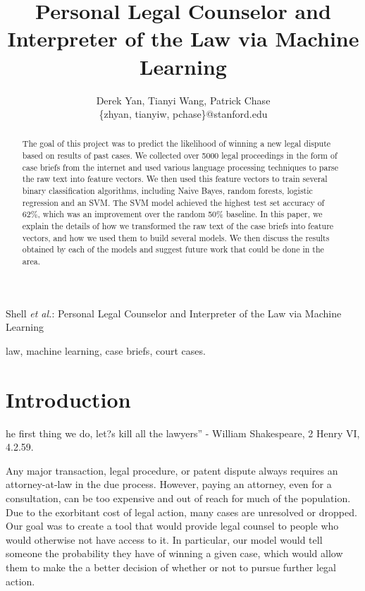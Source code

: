 \documentclass[journal]{IEEEtran}
\begin{document}
\title{Personal Legal Counselor and Interpreter of the Law via Machine Learning}
\author{Derek Yan, Tianyi Wang, Patrick Chase\\
\{zhyan, tianyiw, pchase\}@stanford.edu}
{Shell \MakeLowercase{\textit{et al.}}: Personal Legal Counselor and Interpreter of the Law via Machine Learning}
\maketitle

\begin{abstract}
The goal of this project was to predict the likelihood of winning a new legal dispute based on results of past cases. We collected over 5000 legal proceedings in the form of case briefs from the internet and used various language processing techniques to parse the raw text into feature vectors. We then used this feature vectors to train several binary classification algorithms, including Naive Bayes, random forests, logistic regression and an SVM. The SVM model achieved the highest test set accuracy of 62\%, which was an improvement over the random 50\% baseline. In this paper, we explain the details of how we transformed the raw text of the case briefs into feature vectors, and how we used them to build several models. We then discuss the results obtained by each of the models and suggest future work that could be done in the area.
\end{abstract}

\begin{keywords}
law, machine learning, case briefs, court cases.
\end{keywords}

\section{Introduction}
 he first thing we do, let?s kill all the lawyers'' - William Shakespeare, 2 Henry VI, 4.2.59. 

Any major transaction, legal procedure, or patent dispute always requires an attorney-at-law in the due process. However, paying an attorney, even for a consultation, can be too expensive and out of reach for much of the population. Due to the exorbitant cost of legal action, many cases are unresolved or dropped. Our goal was to create a tool that would provide legal counsel to people who would otherwise not have access to it. In particular, our model would tell someone the probability they have of winning a given case, which would allow them to make the a better decision of whether or not to pursue further legal action. 
\end{document}
